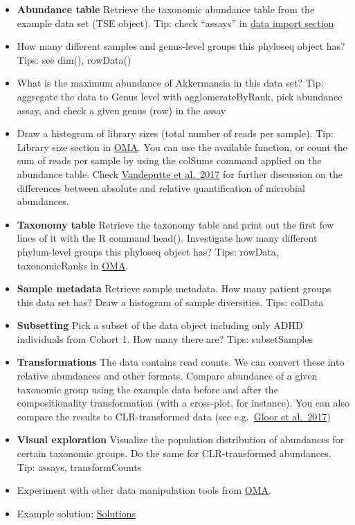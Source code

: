 \documentclass[
  oneside]{book}
\begin{document}
\begin{itemize}
\item
  \textbf{Abundance table} Retrieve the taxonomic abundance table from the
  example data set (TSE object). Tip: check ``assays'' in \href{https://microbiome.github.io/OMA/data-introduction.html\#loading-experimental-microbiome-data}{data import
  section}
\item
  How many different samples and genus-level groups this phyloseq
  object has? Tips: see dim(), rowData()
\item
  What is the maximum abundance of Akkermansia in this data set? Tip:
  aggregate the data to Genus level with agglomerateByRank, pick
  abundance assay, and check a given genus (row) in the assay
\item
  Draw a histogram of library sizes (total number of reads per
  sample). Tip: Library size section in
  \href{https://microbiome.github.io/OMA/quality-control.html}{OMA}. You
  can use the available function, or count the sum of reads per
  sample by using the colSums command applied on the abundance
  table. Check \href{https://www.nature.com/articles/nature24460}{Vandeputte et
  al.~2017} for further
  discussion on the differences between absolute and relative
  quantification of microbial abundances.
\item
  \textbf{Taxonomy table} Retrieve the taxonomy table and print out the
  first few lines of it with the R command head(). Investigate how
  many different phylum-level groups this phyloseq object has? Tips:
  rowData, taxonomicRanks in
  \href{https://microbiome.github.io/OMA/taxonomic-information.html\#functions-to-access-taxonomic-information}{OMA}.
\item
  \textbf{Sample metadata} Retrieve sample metadata. How many patient
  groups this data set has? Draw a histogram of sample
  diversities. Tips: colData
\item
  \textbf{Subsetting} Pick a subset of the data object including only
  ADHD individuals from Cohort 1. How many there are? Tips: subsetSamples
\item
  \textbf{Transformations} The data contains read counts. We can convert
  these into relative abundances and other formats. Compare abundance
  of a given taxonomic group using the example data before and after
  the compositionality transformation (with a cross-plot, for
  instance). You can also compare the results to CLR-transformed data
  (see e.g.~\href{https://www.frontiersin.org/articles/10.3389/fmicb.2017.02224/full}{Gloor et
  al.~2017})
\item
  \textbf{Visual exploration} Visualize the population distribution of
  abundances for certain taxonomic groups. Do the same for
  CLR-transformed abundances. Tip: assays, transformCounts
\item
  Experiment with other data manipulation tools from
  \href{https://microbiome.github.io/OMA/taxonomic-information.html\#functions-to-access-taxonomic-information}{OMA}.
\item
  Example solution: \href{06-3-ex-sol-ADHD.html}{Solutions}
\end{itemize}
\end{document}
